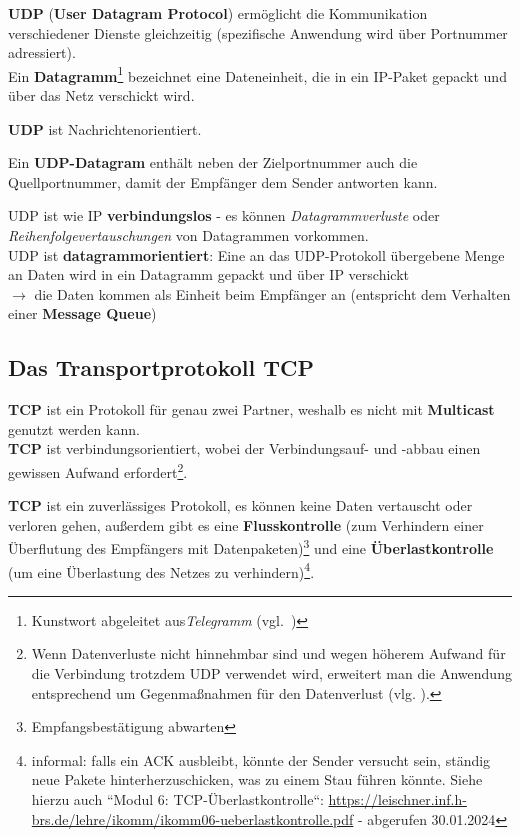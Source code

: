\noindent
\textbf{UDP} (\textbf{User Datagram Protocol}) ermöglicht die Kommunikation verschiedener Dienste gleichzeitig (spezifische Anwendung wird über Portnummer adressiert).\\

\noindent
Ein \textbf{Datagramm}\footnote{
Kunstwort abgeleitet aus\textit{Telegramm} (vgl.~\cite[260]{Oec22})
} bezeichnet eine Dateneinheit, die in ein IP-Paket gepackt und über das Netz verschickt wird.

\begin{tcolorbox}[enlarge top by=0.5cm,enlarge bottom by=0.5cm]
\textbf{UDP} ist Nachrichtenorientiert.
\end{tcolorbox}

\noindent
Ein \textbf{UDP-Datagram} enthält neben der Zielportnummer auch die Quellportnummer, damit der Empfänger dem Sender antworten kann.

\noindent
UDP ist wie IP \textbf{verbindungslos} - es können \textit{Datagrammverluste} oder \textit{Reihenfolgevertauschungen} von Datagrammen vorkommen.\\

\noindent
UDP ist \textbf{datagrammorientiert}: Eine an das UDP-Protokoll übergebene Menge an Daten wird in ein Datagramm gepackt und über IP verschickt\\
$\rightarrow$ die Daten kommen als Einheit beim Empfänger an (entspricht dem Verhalten einer \textbf{Message Queue})


\subsection{Das Transportprotokoll TCP}

\textbf{TCP} ist ein Protokoll für genau zwei Partner, weshalb es nicht mit \textbf{Multicast} genutzt werden kann.\\

\noindent
\textbf{TCP} ist verbindungsorientiert, wobei der Verbindungsauf- und -abbau einen gewissen Aufwand erfordert\footnote{
    Wenn Datenverluste nicht hinnehmbar sind und wegen höherem Aufwand für die Verbindung trotzdem UDP verwendet wird, erweitert man die Anwendung entsprechend um Gegenmaßnahmen für den Datenverlust (vlg. \cite[261]{Oec22}).
}.

\noindent
\textbf{TCP} ist ein zuverlässiges Protokoll, es können keine Daten vertauscht oder verloren gehen, außerdem gibt es eine \textbf{Flusskontrolle} (zum Verhindern einer Überflutung des Empfängers mit Datenpaketen)\footnote{Empfangsbestätigung abwarten} und eine \textbf{Überlastkontrolle} (um eine Überlastung des Netzes zu verhindern)\footnote{informal: falls ein ACK ausbleibt, könnte der Sender versucht sein, ständig neue Pakete hinterherzuschicken, was zu einem Stau führen könnte. Siehe hierzu auch ``Modul 6: TCP-Überlastkontrolle``: \url{https://leischner.inf.h-brs.de/lehre/ikomm/ikomm06-ueberlastkontrolle.pdf} - abgerufen 30.01.2024}.\\


